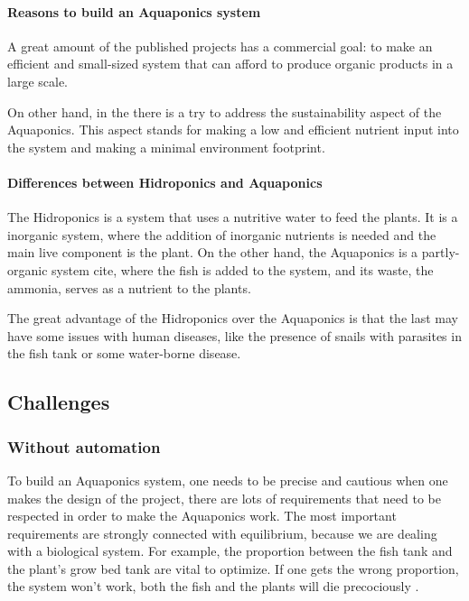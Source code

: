 \paragraph{Reasons to build an Aquaponics system}

A great amount of the published projects has a commercial goal:
to make an efficient and small-sized system that can afford to produce organic products in a large scale.

On other hand,
in the \cite{GoddekDelaideMankasinghEtAl2015} there is a try to address the sustainability aspect of the Aquaponics.
This aspect stands for making a low and efficient nutrient input into the system and making a minimal environment footprint.

\paragraph{Differences between Hidroponics and Aquaponics}

The Hidroponics is a system that uses a nutritive water to feed the plants.
It is a inorganic system, 
where the addition of inorganic nutrients is needed and the main live component is the plant.
On the other hand, the Aquaponics is a partly-organic system cite,
where the fish is added to the system,
and its waste,
the ammonia,
serves as a nutrient to the plants.

The great advantage of the Hidroponics over the Aquaponics is that the last may have some issues with human diseases,
like the presence of snails with parasites in the fish tank or some water-borne disease.


\subsection{Challenges}

\subsubsection{Without automation}
To build an Aquaponics system,
one needs to be precise and cautious when one makes the design of the project,
there are lots of requirements that need to be respected in order to make the Aquaponics work.
The most important requirements are strongly connected with equilibrium,
because we are dealing with a biological system.
For example,
the proportion between the fish tank and the plant's grow bed tank are vital to optimize.
If one gets the wrong proportion,
the system won't work,
both the fish and the plants will die precociously \cite{Leatherbury2014}.

